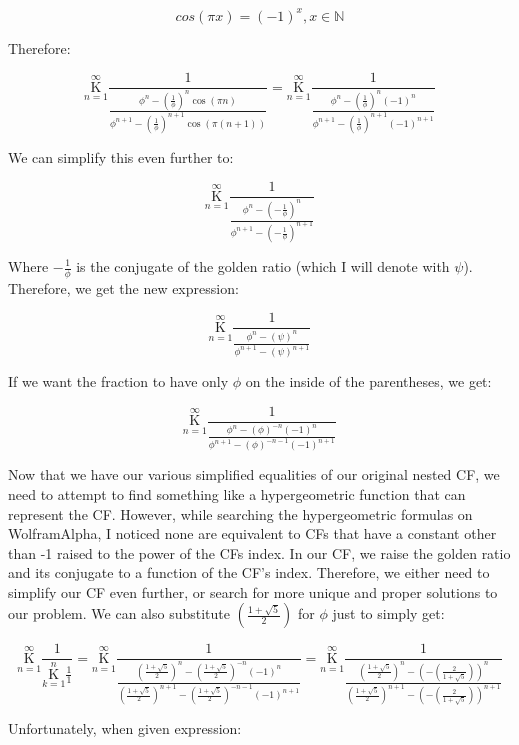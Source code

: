 \documentclass{article}
\begin{document}
$$cos(\pi x)=(-1)^x, x \in \mathbb{N}$$

Therefore:

$$\underset{n=1}{\overset{\infty}{ \mathrm K}} \frac{1}{\frac{\phi^n-(\frac{1}{\phi})^n \cos(\pi n)}{\phi^{n+1}-(\frac{1}{\phi})^{n+1} \cos(\pi (n+1))}}=\underset{n=1}{\overset{\infty}{ \mathrm K}} \frac{1}{\frac{\phi^n-(\frac{1}{\phi})^n (-1)^n}{\phi^{n+1}-(\frac{1}{\phi})^{n+1} (-1)^{n+1}}}$$

We can simplify this even further to:

$$\underset{n=1}{\overset{\infty}{ \mathrm K}} \frac{1}{\frac{\phi^n-(-\frac{1}{\phi})^n}{\phi^{n+1}-(-\frac{1}{\phi})^{n+1}}}$$

Where $-\frac{1}{\phi}$ is the conjugate of the golden ratio (which I will denote with $\psi$). Therefore, we get the new expression:

$$\underset{n=1}{\overset{\infty}{ \mathrm K}} \frac{1}{\frac{\phi^n-(\psi)^n}{\phi^{n+1}-(\psi)^{n+1}}}$$

If we want the fraction to have only $\phi$ on the inside of the parentheses, we get:

$$\underset{n=1}{\overset{ \infty }{ \mathrm K }} \frac{1}{\frac{\phi^n-(\phi)^{-n} (-1)^n}{\phi^{n+1}-(\phi)^{-n-1} (-1)^{n+1}}}$$

Now that we have our various simplified equalities of our original nested CF, we need to attempt to find something like a hypergeometric function that can represent the CF. However, while searching the hypergeometric formulas on WolframAlpha, I noticed none are equivalent to CFs that have a constant other than -1 raised to the power of the CFs index. In our CF, we raise the golden ratio and its conjugate to a function of the CF’s index. Therefore, we either need to simplify our CF even further, or search for more unique and proper solutions to our problem. We can also substitute $(\frac{1+\sqrt{5}}{2})$ for $\phi$ just to simply get:

$$\underset{n=1}{\overset{\infty}{ \mathrm K}} \frac{1}{ \underset{k=1}{\overset{n}{ \mathrm K}} \frac{1}{1} } = \underset{ n=1 }{\overset{ \infty }{ \mathrm K }} \frac{ 1 }{\frac{(\frac{1+\sqrt{5}}{2})^{n} - (\frac{1+\sqrt{5}}{2})^{-n} (-1)^n}{(\frac{1+\sqrt{5}}{2})^{n+1} - (\frac{1+\sqrt{5}}{2})^{-n-1} (-1)^{n+1}}} = \underset{n=1}{\overset{\infty}{ \mathrm K}} \frac{1}{\frac{(\frac{1+\sqrt{5}}{2})^n-(-(\frac{2}{1+\sqrt{5}}))^n}{(\frac{1+\sqrt{5}}{2})^{n+1}-(-(\frac{2}{1+\sqrt{5}}))^{n+1}}}$$

Unfortunately, when given expression:
\end{document}
